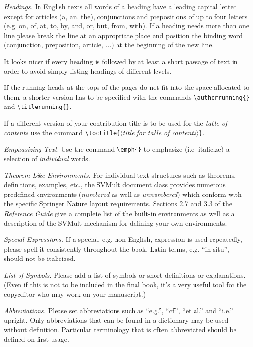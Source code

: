 \documentclass[graybox]{svmult}
\begin{document}
\begin{refguide}
\begin{sloppy}
{\it Headings.} In English texts all words of a heading have a leading capital letter except for articles (a, an, the), conjunctions and prepositions of up to four letters (e.g. on, of, at, to, by, and, or, but, from, with). If a heading needs more than one line please break the line at an appropriate place and position the binding word (conjunction, preposition, article, ...) at the beginning of the new line.

It looks nicer if every heading is followed by at least a short passage of text in order to avoid simply listing headings of different levels.

If the running heads at the tops of the pages do not fit into the space allocated to them, a shorter version has to be specified with the commands \verb|\authorrunning{}| and \verb|\titlerunning{}|.

If a different version of your contribution title is to be used for the {\it table of contents} use the command \verb|\toctitle{|$\langle${\it title for table of contents}$\rangle$\verb|}|.

{\it Emphasizing Text.} Use the command \verb|\emph{}| to emphasize (i.e. italicize) a selection of {\it individual} words.

 {\it Theorem-Like Environments.} For individual text structures such as theorems, definitions, examples, etc., the {\sc SVMult} document class provides numerous predefined environments ({\it numbered} as well as {\it unnumbered}) which conform with the specific Springer Nature layout requirements. Sections 2.7 and 3.3 of the {\it Reference Guide} give a complete list of the built-in environments as well as a description of the {\sc SVMult} mechanism for defining your own environments.

{\it Special Expressions.} If a special, e.g. non-English, expression is used repeatedly, please spell it consistently throughout the book. Latin terms, e.g. ``in situ'', should not be italicized.

{\it List of Symbols.} Please add a list of symbols or short definitions or explanations. (Even if this is not to be included in the final book, it's a very useful tool for the copyeditor who may work on your manuscript.)

{\it Abbreviations.} Please set abbreviations such as ``e.g.'', ``cf.'', ``et al.'' and ``i.e.'' upright. Only abbreviations that can be found in a dictionary may be used without definition. Particular terminology that is often abbreviated should be defined on first usage.


\end{sloppy}
\end{refguide}
\end{document}
